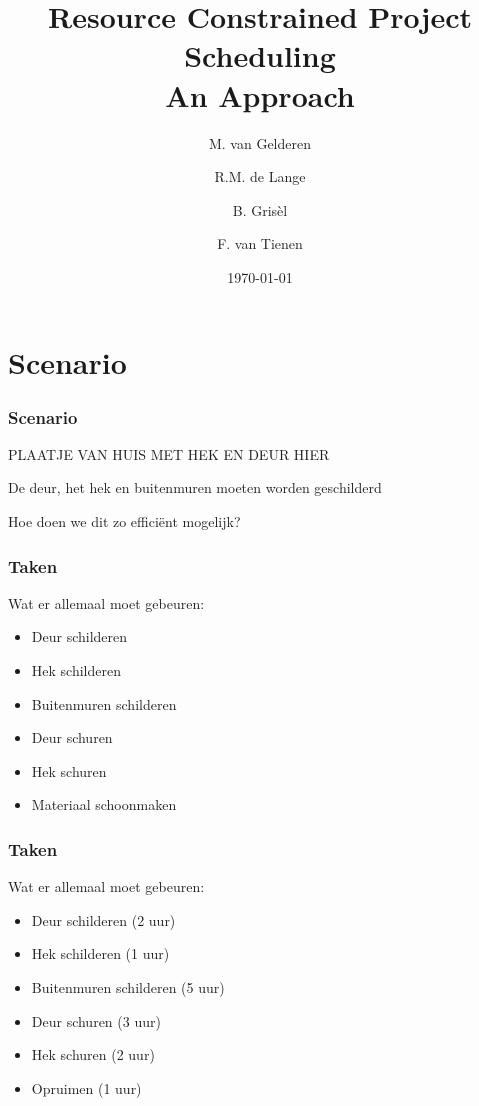 \documentclass{beamer}
\title[RCPS]{Resource Constrained Project Scheduling\\
An Approach}
\author{M. van Gelderen  \and
    R.M. de Lange \and
    B. Gris\`el \and
    F. van Tienen}
\institute{TU Delft}
\date{\today}
\theoremstyle{definition}
\begin{document}
\begin{frame}
\titlepage
\end{frame}


\section*{Scenario}

\begin{frame}
    \frametitle{Scenario}
    PLAATJE VAN HUIS MET HEK EN DEUR HIER
    
    \begin{center}
    	De deur, het hek en buitenmuren moeten worden geschilderd
    \end{center}
\end{frame}

\begin{frame}
    \begin{center}
    	Hoe doen we dit zo effici\"{e}nt mogelijk?
    \end{center}
\end{frame}

\begin{frame}
    \frametitle{Taken}
    Wat er allemaal moet gebeuren:
     \begin{itemize}
    	\item Deur schilderen
	\item Hek schilderen
	\item Buitenmuren schilderen
	\item<2-> Deur schuren
	\item<2-> Hek schuren
	\item<3-> Materiaal schoonmaken
    \end{itemize}
\end{frame}

\begin{frame}
    \frametitle{Taken}
    Wat er allemaal moet gebeuren:
     \begin{itemize}
    	\item Deur schilderen (2 uur)
	\item Hek schilderen (1 uur)
	\item Buitenmuren schilderen (5 uur)
	\item Deur schuren (3 uur)
	\item Hek schuren (2 uur)
	\item Opruimen (1 uur)
    \end{itemize}
\end{frame}
\end{document}
